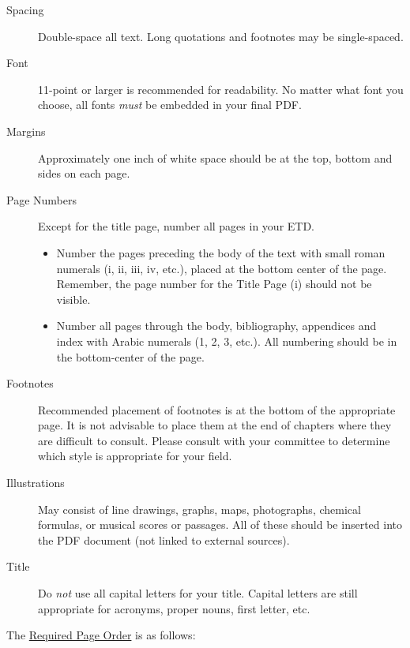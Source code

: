 \documentclass{article}
\begin{document}
\begin{description}
\item[Spacing] Double-space all text. Long quotations and footnotes may be single-spaced.
\item[Font] 11-point or larger is recommended for readability. 
No matter what font you choose, all fonts \emph{must} be embedded in your final PDF.
\item[Margins] Approximately one inch of white space should be at the top, bottom and sides on each page.
\item[Page Numbers] Except for the title page, number all pages in your ETD.
  \begin{itemize}
  \item Number the pages preceding the body of the text with small
    roman numerals (i, ii, iii, iv, etc.), placed at the bottom center
    of the page.  Remember, the page number for the Title Page (i)
    should not be visible.  
  \item Number all pages through the body,
    bibliography, appendices and index with Arabic numerals (1, 2, 3,
    etc.).  All numbering should be in the bottom-center of the page.
  \end{itemize}
\item[Footnotes] Recommended placement of footnotes is at the bottom of the appropriate page. 
  It is not advisable to place them at the end of chapters where they are difficult to consult. 
  Please consult with your committee to determine which style is appropriate for your field.
\item[Illustrations] May consist of line drawings, graphs, maps, photographs, chemical formulas, or musical scores or passages. 
  All of these should be inserted into the PDF document (not linked to external sources).
\item[Title] Do \emph{not} use all capital letters for your title. 
  Capital letters are still appropriate for acronyms, proper nouns, first letter, etc.
\end{description}

The \href{http://grad.uc.edu/student-life/etd/page_order.html}{Required Page Order} is as follows:
\end{document}
